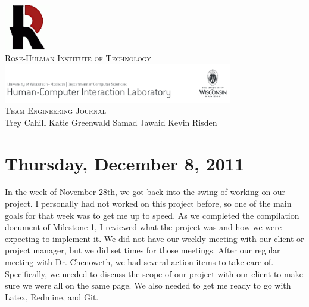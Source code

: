 \documentclass{article}
\begin{document}
\begin{titlepage}
\begin{center}
\includegraphics[width=0.15\textwidth]{images/rh}\\[1.0cm]
\textsc{\large Rose-Hulman Institute of Technology}\\[1.5cm]
\includegraphics[width=0.75\textwidth]{images/pss}\\[1.0cm]
\textsc{\large Team Engineering Journal}\\[1.0cm]
\large Trey Cahill \hspace{0.2cm} Katie Greenwald \hspace{0.2cm} Samad Jawaid \hspace{0.2cm} Kevin Risden
\end{center}
\end{titlepage}
\newpage

\section{Thursday, December 8, 2011} %
In the week of November 28th, we got back into the swing of working on our project. I
personally had not worked on this project before, so one of the main goals for that
week was to get me up to speed. As we completed the compilation document of Milestone
1, I reviewed what the project was and how we were expecting to implement it. We did
not have our weekly meeting with our client or project manager, but we did set times
for those meetings. After our regular meeting with Dr. Chenoweth, we had several
action items to take care of. Specifically, we needed to discuss the scope of our
project with our client to make sure we were all on the same page. We also needed to
get me ready to go with Latex, Redmine, and Git.
\end{document}
